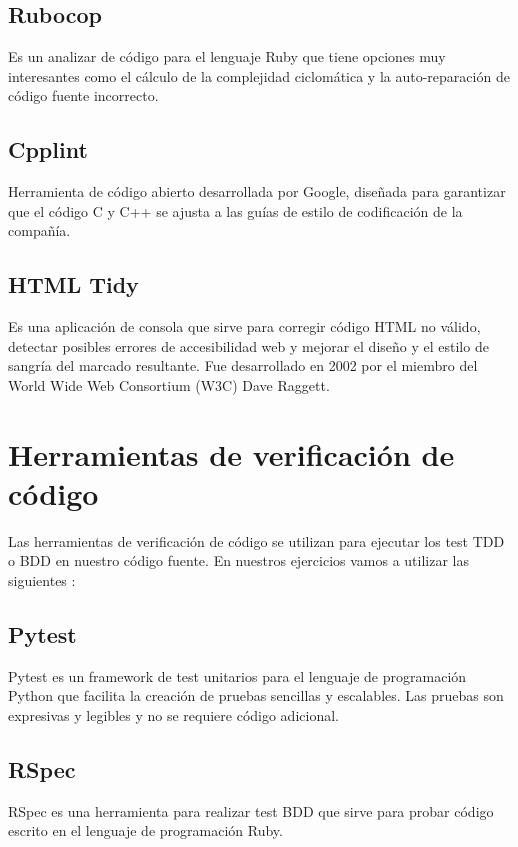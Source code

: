 \subsection{Rubocop}

Es un analizar de código para el lenguaje Ruby que tiene opciones muy interesantes como el cálculo de la complejidad ciclomática y la auto-reparación de código fuente incorrecto.

\subsection{Cpplint}

Herramienta de código abierto desarrollada por Google, diseñada para garantizar que el código C y C++ se ajusta a las guías de estilo de codificación de la compañía.

\subsection {HTML Tidy}

Es una aplicación de consola que sirve para corregir código HTML no válido, detectar posibles errores de accesibilidad web y mejorar el diseño y el estilo de sangría del marcado resultante. Fue desarrollado en 2002 por el miembro del World Wide Web Consortium (W3C) Dave Raggett.

\section {Herramientas de verificación de código}

Las herramientas de verificación de código se utilizan para ejecutar los test TDD o BDD en nuestro código fuente. En nuestros ejercicios vamos a utilizar las siguientes  :

\subsection {Pytest}

Pytest es un framework de test unitarios para el lenguaje de programación Python que facilita la creación de pruebas sencillas y escalables. Las pruebas son expresivas y legibles y no se requiere código adicional.

\subsection {RSpec}

RSpec es una herramienta para realizar test BDD que sirve para probar código escrito en el lenguaje de programación Ruby.

